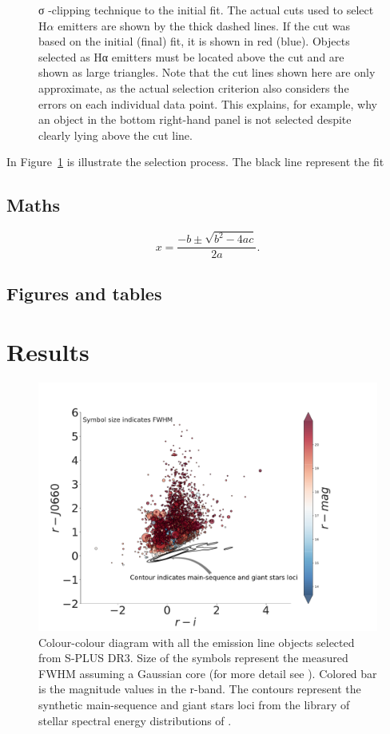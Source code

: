 \documentclass[fleqn,usenatbib]{mnras}
\begin{document}
\begin{figure}
{σ -clipping technique to the initial fit. The actual cuts used to select H{$\alpha$} emitters are shown by the thick dashed lines. If the cut was based on the initial (final)
fit, it is shown in red (blue). Objects selected as Hα emitters must be located above the cut and are shown as large triangles. Note that the cut lines shown here
are only approximate, as the actual selection criterion also considers the errors on each individual data point. This explains, for example, why an object in the bottom right-hand panel is not selected despite clearly lying above the cut line.}
  \label{fig:criteria-color-plot}
\end{figure}

In Figure~\ref{fig:criteria-color-plot} is illustrate the selection process.  The black line represent the fit  

\subsection{Maths}
\label{sec:maths} %


\begin{equation}

    x=\frac{-b\pm\sqrt{b^2-4ac}}{2a}.
	\label{eq:quadratic}
\end{equation}


\subsection{Figures and tables}

\section{Results}
\label{sec:results}

\begin{figure}
	\includegraphics[width=0.9\linewidth]{Figs/final-emitters.pdf}
    \caption{Colour-colour diagram with all the emission line objects selected from S-PLUS DR3. Size of the symbols represent the measured FWHM assuming a Gaussian core (for more detail see \citealt{Fernandes:2021}). Colored bar is the magnitude values in the r-band. The contours represent the synthetic main-sequence and giant stars loci from the library of stellar spectral energy distributions of \citet{Pickles:1998}.}
    \label{fig:emission}
\end{figure}
\end{document}

